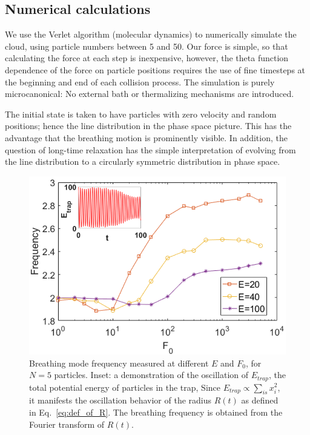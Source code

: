 \documentclass[a4paper, onecolumn]{revtex4-1}
\begin{document}
\subsection{Numerical calculations}

We use the Verlet algorithm (molecular dynamics) to numerically simulate the cloud, using particle
numbers between 5 and 50.  Our force is simple, so that calculating the force at each step is
inexpensive, however, the theta function dependence of the force on particle positions requires the
use of fine timesteps at the beginning and end of each collision process.  The simulation is purely
microcanonical: No external bath or thermalizing mechanisms are introduced. 

The initial state is taken to have particles with zero velocity and random positions; hence the line
distribution in the phase space picture.  This has the advantage that the breathing motion is
prominently visible.  In addition, the question of long-time relaxation has the simple
interpretation of evolving from the line distribution to a circularly symmetric distribution in
phase space.





\begin{figure}[tbp]
\center
\includegraphics[scale=0.32]{ZhiyuPictures/freq_scanF_differentE_log_2_with_oscillation_demo.png}
\caption{Breathing mode frequency measured at different $E$ and $F_0$, for $N=5$ particles. Inset: a
  demonstration of the oscillation of $E_{trap}$, the total potential energy of particles in the
  trap, Since $E_{trap}\propto \sum_{is}{x_i^2}$, it manifests the oscillation behavior of the
  radius $R(t)$ as defined in Eq.~\ref{eq:def_of_R}.  The breathing frequency is obtained from the
  Fourier transform of $R(t)$.}
\label{fig:Breathingfrequency1}
\end{figure}
\end{document}
